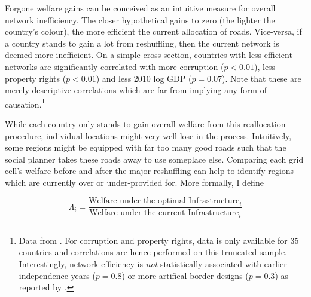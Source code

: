 \documentclass[11pt, oneside]{article}   	%
\begin{document}
Forgone welfare gains can be conceived as an intuitive measure for overall network inefficiency. The closer hypothetical gains to zero (the lighter the country's colour), the more efficient the current allocation of roads. Vice-versa, if a country stands to gain a lot from reshuffling, then the current network is deemed more inefficient. On a simple cross-section, countries with less efficient networks are significantly correlated with more corruption ($p < 0.01$), less property rights ($p < 0.01$) and less 2010 log GDP ($p=0.07$). Note that these are merely descriptive correlations which are far from implying any form of causation.\footnote{Data from \cite{the_world_bank_world_2017}. For corruption and property rights, data is only available for 35 countries and correlations are hence performed on this truncated sample. Interestingly, network efficiency is \emph{not} statistically associated with earlier independence years ($p=0.8$) or more artifical border designs ($p=0.3$) as reported by \cite{Alesina_ArtificialStates_2011}.}

While each country only stands to gain overall welfare from this reallocation procedure, individual locations might very well lose in the process. Intuitively, some regions might be equipped with far too many good roads such that the social planner takes these roads away to use someplace else. Comparing each grid cell's welfare before and after the major reshuffling can help to identify regions which are currently over or under-provided for. More formally, I define

\begin{equation}
  \Lambda_{i} = \frac{\textrm{Welfare under the optimal Infrastructure}_{i}}{\textrm{Welfare under the current Infrastructure}_{i}}
\end{equation}
\end{document}
